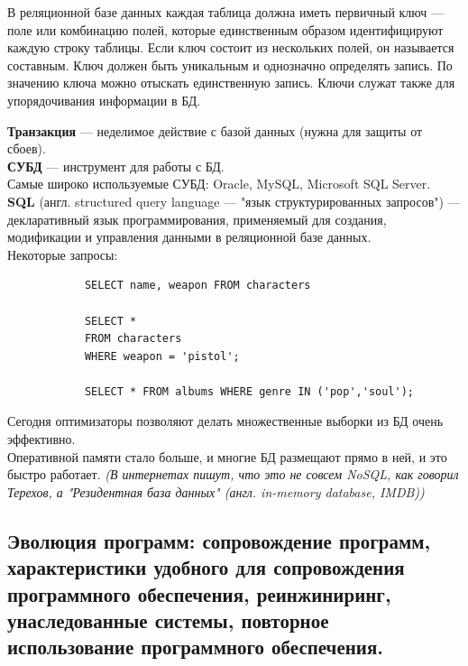 \documentclass[12pt, a4paper]{article}
\begin{document}
\begin{itemize}
    В реляционной базе данных каждая таблица должна иметь первичный ключ — поле или комбинацию полей, которые единственным образом идентифицируют каждую строку таблицы. Если ключ состоит из нескольких полей, он называется составным. Ключ должен быть уникальным и однозначно определять запись. По значению ключа можно отыскать единственную запись. Ключи служат также для упорядочивания информации в БД.

\end{itemize}

    \textbf{Транзакция} --- неделимое действие с базой данных (нужна для защиты от сбоев).\\
    
    \textbf{СУБД} --- инструмент для работы с БД.\\
    
    Самые широко используемые СУБД: Oracle, MySQL, Microsoft SQL Server.\\
    
    \textbf{SQL} (англ. structured query language — "язык структурированных запросов"{}) — декларативный язык программирования, применяемый для создания, модификации и управления данными в реляционной базе данных. \\
    Некоторые запросы:
    \begin{verbatim}
            SELECT name, weapon FROM characters
            
            SELECT * 
            FROM characters
            WHERE weapon = 'pistol';
            
            SELECT * FROM albums WHERE genre IN ('pop','soul');
    \end{verbatim}
    
    Сегодня оптимизаторы позволяют делать множественные выборки из БД очень эффективно.\\
    
    Оперативной памяти стало больше, и многие БД размещают прямо в ней, и это быстро работает. \textit{(В интернетах пишут, что это не совсем NoSQL, как говорил Терехов, а "Резидентная база данных"{} (англ. in-memory database, IMDB))}

\subsection{Эволюция программ: сопровождение программ, характеристики удобного для сопровождения программного обеспечения, реинжиниринг, унаследованные системы, повторное использование программного обеспечения.}
\end{document}
